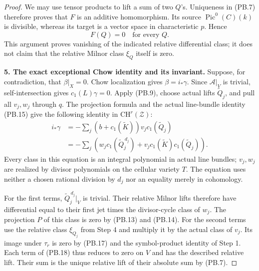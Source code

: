 \begin{proof}
We may use tensor products to lift a sum of two $Q$'s. Uniqueness
in (PB.7) therefore proves that $F$ is an additive homomorphism.
Its source $\operatorname{Pic}^0(C)(k)$ is divisible, whereas its
target is a vector space in characteristic $p$. Hence
\[
                         F(Q)=0\quad\text{for every }Q.
 \tag{PB.17}
\]
This argument proves vanishing of the indicated relative differential
class; it does not claim that the relative Milnor class $\xi_Q$
itself is zero.

\textbf{5. The exact exceptional Chow identity and its invariant.}
Suppose, for contradiction, that $\beta|_X=0$. Chow localization
gives $\beta=i_*\gamma$. Since $\mathcal A|_V$ is trivial,
self-intersection gives $c_1(L)\gamma=0$. Apply (PB.9), choose
actual lifts $\widetilde Q_j$, and pull all $v_j,w_j$ through $q$.
The projection formula and the actual line-bundle identity (PB.15)
give the following identity in $\mathrm{CH}^r(\mathcal Z)$:
\[
 \begin{split}
 i_*\gamma
  &= -\sum_j(b+c_1(\widetilde K))v_jc_1(\widetilde Q_j)\\
  &= -\sum_j\left(
          w_jc_1(\widetilde Q_j^{\,d_j})
          +v_jc_1(\widetilde K)c_1(\widetilde Q_j)\right).
 \end{split}
 \tag{PB.18}
\]
Every class in this equation is an integral polynomial in actual
line bundles; $v_j,w_j$ are realized by divisor polynomials on the
cellular variety $T$. The equation uses neither a chosen rational
division by $d_j$ nor an equality merely in cohomology.

For the first terms, $\widetilde Q_j^{\,d_j}|_V$ is trivial.
Their relative Milnor lifts therefore have differential equal to
their first jet times the divisor-cycle class of $w_j$.
The projection $P$ of this class is zero by (PB.13) and (PB.14).
For the second terms use the relative class $\xi_{Q_j}$ from
Step 4 and multiply it by the actual class of $v_j$.
Its image under $\tau_r$ is zero by (PB.17) and the symbol-product
identity of Step 1. Each term of (PB.18) thus reduces to zero on
$V$ and has the described relative lift. Their sum is the unique
relative lift of their absolute sum by (PB.7).


\end{proof}
